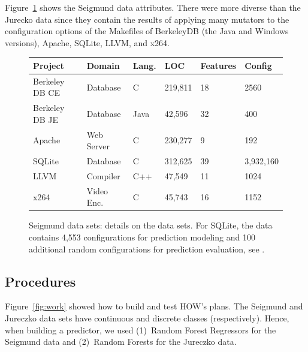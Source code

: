 \documentclass[conference]{IEEEtran}
\newcommand{\fig}[1]{Figure~\ref{fig:#1}}
\begin{document}
   \fig{cpm} shows the  Seigmund data attributes.
   There were more diverse than the 
    Jurecko data since they
   contain the results of applying many  mutators
  to the configuration options of the Makefiles of  BerkeleyDB (the Java  and  Windows  versions),  Apache,  SQLite,  LLVM, and x264.  


 

\begin{figure}[!t]
\scriptsize
\begin{tabular}{llllll}
  \hline
  \rowcolor{lightgray}
Project & Domain & Lang. & LOC & Features & Config\\\hline
Berkeley DB CE & Database & C & 219,811 & 18 & 2560\\
Berkeley DB JE & Database & Java & 42,596 & 32  & 400\\
Apache & Web Server & C & 230,277 & 9 & 192\\
SQLite & Database & C & 312,625 & 39 & 3,932,160\\
LLVM & Compiler & C++ & 47,549 & 11 & 1024\\
x264 & Video Enc. & C& 45,743 & 16 & 1152\\\hline
\end{tabular}
 
\caption{Seigmund data sets: details on the data sets.
For SQLite, the data  contains 4,553 configurations for prediction modeling and 100 additional random configurations for prediction evaluation, see \cite{vapp}.}\label{fig:cpm}
\end{figure}





   \subsection{Procedures}
  \fig{work} showed how to   build and test HOW's plans.
The    Seigmund and Jureczko data sets have continuous and discrete classes (respectively).
Hence, when building a predictor, we used (1)~Random Forest Regressors for the Seigmund data and (2)~Random Forests
for the Jureczko data.
\end{document}
